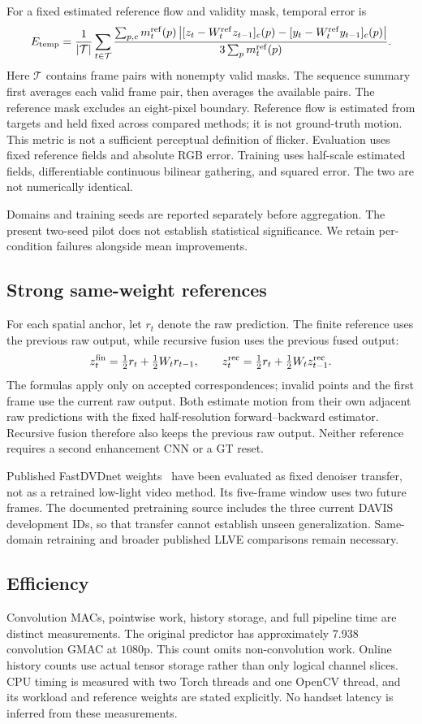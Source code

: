 For a fixed estimated reference flow and validity mask, temporal error is
\[
 E_{\rm temp}=\frac{1}{|\mathcal T|}\sum_{t\in\mathcal T}
 \frac{\sum_{p,c}m_t^{\rm ref}(p)
 \left|[z_t-W_t^{\rm ref}z_{t-1}]_c(p)
       -[y_t-W_t^{\rm ref}y_{t-1}]_c(p)\right|}
 {3\sum_p m_t^{\rm ref}(p)}.
\]
Here $\mathcal T$ contains frame pairs with nonempty valid masks. The
sequence summary first averages each valid frame pair, then averages
the available pairs. The reference mask excludes an
eight-pixel boundary. Reference flow is estimated from targets and held
fixed across compared methods; it is not ground-truth motion.
This metric is not a sufficient perceptual definition of flicker.
Evaluation uses fixed reference fields and absolute RGB error. Training
uses half-scale estimated fields, differentiable continuous bilinear
gathering, and squared error. The two are not numerically identical.

Domains and training seeds are reported separately before aggregation.
The present two-seed pilot does not establish statistical significance.
We retain per-condition failures alongside mean improvements.

\subsection{Strong same-weight references}
For each spatial anchor, let $r_t$ denote the raw prediction. The finite
reference uses the previous raw output, while recursive fusion uses the
previous fused output:
\[
 z_t^{\rm fin}=\tfrac12 r_t+\tfrac12 W_t r_{t-1},
 \qquad
 z_t^{\rm rec}=\tfrac12 r_t+\tfrac12 W_t z_{t-1}^{\rm rec}.
\]
The formulas apply only on accepted correspondences; invalid points and the
first frame use the current raw output. Both estimate motion from their own
adjacent raw predictions with the fixed half-resolution forward--backward
estimator. Recursive fusion therefore also keeps the previous raw output.
Neither reference requires a second enhancement CNN or a GT reset.

Published FastDVDnet weights~\cite{fastdvdnet} have been evaluated as
fixed denoiser transfer, not as a retrained low-light video method.
Its five-frame window uses two future frames. The documented pretraining
source includes the three current DAVIS development IDs, so that transfer
cannot establish unseen generalization. Same-domain retraining and broader
published LLVE comparisons remain necessary.

\subsection{Efficiency}
Convolution MACs, pointwise work, history storage, and full pipeline time
are distinct measurements. The original predictor has approximately
7.938 convolution GMAC at $1080\mathrm p$. This count omits non-convolution
work. Online history counts use actual tensor storage rather than only
logical channel slices. CPU timing is measured with two Torch threads and
one OpenCV thread, and its workload and reference weights are stated
explicitly. No handset latency is inferred from these measurements.
